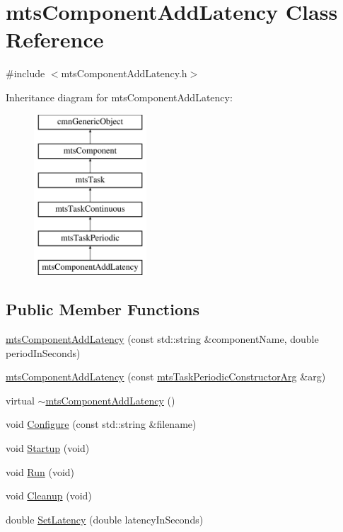 \hypertarget{classmts_component_add_latency}{\section{mts\-Component\-Add\-Latency Class Reference}
\label{classmts_component_add_latency}
}


{\ttfamily \#include $<$mts\-Component\-Add\-Latency.\-h$>$}

Inheritance diagram for mts\-Component\-Add\-Latency\-:\begin{figure}[H]
\begin{center}
\leavevmode
\includegraphics[height=6.000000cm]{d5/d00/classmts_component_add_latency}
\end{center}
\end{figure}
\subsection*{Public Member Functions}
\begin{DoxyCompactItemize}
\item 
\hyperlink{classmts_component_add_latency_a5e9722e59155cf09209eafccbd263632}{mts\-Component\-Add\-Latency} (const std\-::string \&component\-Name, double period\-In\-Seconds)
\item 
\hyperlink{classmts_component_add_latency_a56dfb464eba7d24819479e05b7323e53}{mts\-Component\-Add\-Latency} (const \hyperlink{classmts_task_periodic_constructor_arg}{mts\-Task\-Periodic\-Constructor\-Arg} \&arg)
\item 
virtual \hyperlink{classmts_component_add_latency_a345ba0d0ee9b30281f93f2c631a25664}{$\sim$mts\-Component\-Add\-Latency} ()
\item 
void \hyperlink{classmts_component_add_latency_aa1c5b4df35aa09a667383bd53ef22518}{Configure} (const std\-::string \&filename)
\item 
void \hyperlink{classmts_component_add_latency_ad854921041145afcf9b88d8802b16095}{Startup} (void)
\item 
void \hyperlink{classmts_component_add_latency_a0991c25360c716a374fc8c2543840688}{Run} (void)
\item 
void \hyperlink{classmts_component_add_latency_a4cfe3d9a65d29a7a601eb508bf50076c}{Cleanup} (void)
\item 
double \hyperlink{classmts_component_add_latency_aa3d6d2e75bb2a37627a61f22cc68ac06}{Set\-Latency} (double latency\-In\-Seconds)
\end{DoxyCompactItemize}
